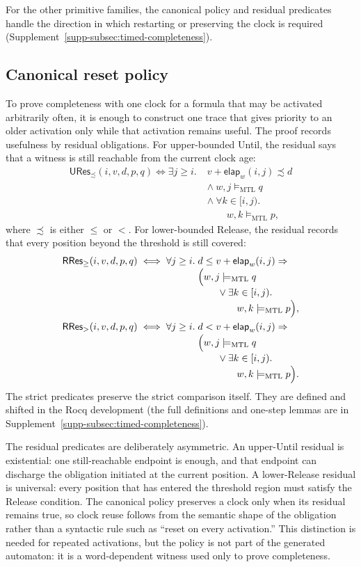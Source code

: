 \documentclass[10pt,journal,compsoc]{IEEEtran}
\newcommand{\satM}{\models_{\mathrm{MTL}}}
\newcommand{\elapsed}{\mathsf{elap}}
\begin{document}
For the other primitive families, the canonical policy and residual
predicates handle the direction in which restarting or preserving the clock
is required (Supplement~\ref{supp-subsec:timed-completeness}).

\subsection{Canonical reset policy}
\label{subsec:canonical-main}
To prove completeness with one
clock for a formula that may be activated arbitrarily often, it is enough to
construct one trace that gives priority to an older activation only while
that activation remains useful. The proof records usefulness by residual
obligations. For upper-bounded Until, the residual says that a witness is
still reachable from the current clock age:
\begin{align*}
\mathsf{URes}_{\precsim}(i,v,d,p,q)\iff
\exists j\ge i.\;&v+\elapsed_w(i,j)\precsim d\\[-1mm]
&\land\ w,j\satM q\\[-1mm]
&\land\ \forall k\in[i,j).\\[-1mm]
&\qquad w,k\satM p,
\end{align*}
where $\precsim$ is either $\le$ or $<$. For lower-bounded Release, the
residual records that every position beyond the threshold is still covered:
\begin{align*}
\mathsf{RRes}_{\ge}(i,v,d,p,q)\iff
\forall j\ge i.\;&d\le v+\elapsed_w(i,j)\Rightarrow\\[-1mm]
&\Bigl(w,j\satM q\\[-1mm]
&\qquad\lor\exists k\in[i,j).\\[-1mm]
&\qquad\qquad w,k\satM p\Bigr),\\
\mathsf{RRes}_{>}(i,v,d,p,q)\iff
\forall j\ge i.\;&d<v+\elapsed_w(i,j)\Rightarrow\\[-1mm]
&\Bigl(w,j\satM q\\[-1mm]
&\qquad\lor\exists k\in[i,j).\\[-1mm]
&\qquad\qquad w,k\satM p\Bigr).
\end{align*}
The strict predicates preserve the strict comparison itself. They are
defined and shifted in the Rocq development (the full definitions and
one-step lemmas are in Supplement~\ref{supp-subsec:timed-completeness}).

The residual predicates are deliberately asymmetric. An upper-Until residual
is existential: one still-reachable endpoint is enough, and that endpoint
can discharge the obligation initiated at the current position. A
lower-Release residual is universal: every position that has entered the
threshold region must satisfy the Release condition. The canonical policy
preserves a clock only when its residual remains true, so clock reuse follows
from the semantic shape of the obligation rather than a syntactic rule such
as “reset on every activation.” This distinction is needed for repeated
activations, but the policy is not part of the generated automaton: it is a
word-dependent witness used only to prove completeness.
\end{document}
